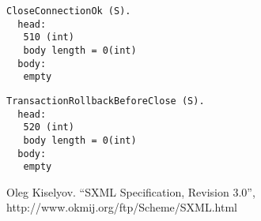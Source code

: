 \documentclass[a4paper,12pt]{article}
\begin{document}
\begin{verbatim}
CloseConnectionOk (S).
  head:
   510 (int)
   body length = 0(int)
  body:
   empty
\end{verbatim}

\begin{verbatim}
TransactionRollbackBeforeClose (S).
  head:
   520 (int)
   body length = 0(int)
  body:
   empty
\end{verbatim}

\begin{thebibliography}{1}

Oleg Kiselyov.
``SXML Specification, Revision 3.0'',
http://www.okmij.org/ftp/Scheme/SXML.html
\end{thebibliography}
\end{document}
